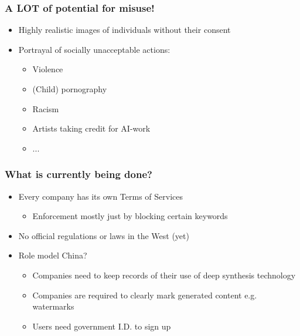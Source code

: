 \documentclass[
	11pt, compress%
]{beamer}
\begin{document}
\begin{frame}
	\frametitle{A LOT of potential for misuse!}
	\begin{itemize}
		\setlength\itemsep{1em}
			\item{Highly realistic images of individuals without their consent}
			\item{Portrayal of socially unacceptable actions:}
			\begin{itemize}
			\setlength\itemsep{0,5em}
			\item{Violence}
			\item{(Child) pornography}
			\item{Racism}
			\item{Artists taking credit for AI-work}
			\item{...}
			\end{itemize}
	\end{itemize}
\end{frame}

\begin{frame}
	\frametitle{What is currently being done?}
	\begin{itemize}
		\setlength\itemsep{1em}
		\item Every company has its own Terms of Services
		\begin{itemize}
			\item Enforcement mostly just by blocking certain keywords
		\end{itemize}
		\item No official regulations or laws in the West (yet)
		\item Role model China?\cite{CACGuidelines}
		\begin{itemize}
			\setlength\itemsep{0,5em}
			\item Companies need to keep records of their use of deep synthesis technology
			\item Companies are required to clearly mark generated content e.g. watermarks
			\item Users need government I.D. to sign up
		\end{itemize}
	\end{itemize}
\end{frame}
\end{document}
